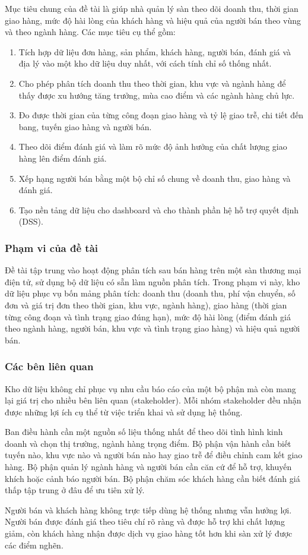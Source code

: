 Mục tiêu chung của đề tài là giúp nhà quản lý sàn theo dõi doanh thu, thời gian giao hàng, mức độ hài lòng của khách hàng và hiệu quả của người bán theo vùng và theo ngành hàng. Các mục tiêu cụ thể gồm:

\begin{enumerate}
\item Tích hợp dữ liệu đơn hàng, sản phẩm, khách hàng, người bán, đánh giá và địa lý vào một kho dữ liệu duy nhất, với cách tính chỉ số thống nhất.
\item Cho phép phân tích doanh thu theo thời gian, khu vực và ngành hàng để thấy được xu hướng tăng trưởng, mùa cao điểm và các ngành hàng chủ lực.
\item Đo được thời gian của từng công đoạn giao hàng và tỷ lệ giao trễ, chi tiết đến bang, tuyến giao hàng và người bán.
\item Theo dõi điểm đánh giá và làm rõ mức độ ảnh hưởng của chất lượng giao hàng lên điểm đánh giá.
\item Xếp hạng người bán bằng một bộ chỉ số chung về doanh thu, giao hàng và đánh giá.
\item Tạo nền tảng dữ liệu cho dashboard và cho thành phần hệ hỗ trợ quyết định (DSS).
\end{enumerate}

\subsubsection{Phạm vi của đề tài}\label{sec:phamvi}
Đề tài tập trung vào hoạt động phân tích sau bán hàng trên một sàn thương mại điện tử, sử dụng bộ dữ liệu có sẵn làm nguồn phân tích. Trong phạm vi này, kho dữ liệu phục vụ bốn mảng phân tích: doanh thu (doanh thu, phí vận chuyển, số đơn và giá trị đơn theo thời gian, khu vực, ngành hàng), giao hàng (thời gian từng công đoạn và tình trạng giao đúng hạn), mức độ hài lòng (điểm đánh giá theo ngành hàng, người bán, khu vực và tình trạng giao hàng) và hiệu quả người bán.

\subsubsection{Các bên liên quan}
Kho dữ liệu không chỉ phục vụ nhu cầu báo cáo của một bộ phận mà còn mang lại giá trị cho nhiều bên liên quan (stakeholder). Mỗi nhóm stakeholder đều nhận được những lợi ích cụ thể từ việc triển khai và sử dụng hệ thống.

Ban điều hành cần một nguồn số liệu thống nhất để theo dõi tình hình kinh doanh và chọn thị trường, ngành hàng trọng điểm. Bộ phận vận hành cần biết tuyến nào, khu vực nào và người bán nào hay giao trễ để điều chỉnh cam kết giao hàng. Bộ phận quản lý ngành hàng và người bán cần căn cứ để hỗ trợ, khuyến khích hoặc cảnh báo người bán. Bộ phận chăm sóc khách hàng cần biết đánh giá thấp tập trung ở đâu để ưu tiên xử lý.

Người bán và khách hàng không trực tiếp dùng hệ thống nhưng vẫn hưởng lợi. Người bán được đánh giá theo tiêu chí rõ ràng và được hỗ trợ khi chất lượng giảm, còn khách hàng nhận được dịch vụ giao hàng tốt hơn khi sàn xử lý được các điểm nghẽn.
